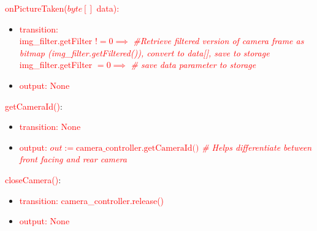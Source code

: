 \documentclass[12pt, titlepage]{article}
\begin{document}
\noindent \textcolor{red}{onPictureTaken($byte[]$ data):}
\begin{itemize}
\item \textcolor{red}{transition: \\img\_filter.getFilter $!= 0 \implies $ \textit{\#Retrieve filtered version of camera frame as bitmap (img\_filter.getFiltered()), convert to data[], save to storage}\\
img\_filter.getFilter $= 0 \implies$ \textit{\# save data parameter to storage}}
\item \textcolor{red}{output: None}
\end{itemize}

\noindent \textcolor{red}{getCameraId()}:
\begin{itemize}
\item \textcolor{red}{transition: None}
\item \textcolor{red}{output: $out := \text{camera\_controller.getCameraId()}$ \textit{\# Helps differentiate between front facing and rear camera}}
\end{itemize}

\noindent \textcolor{red}{closeCamera()}:
\begin{itemize}
\item \textcolor{red}{transition: camera\_controller.release()}
\item \textcolor{red}{output: None}
\end{itemize}
\end{document}
